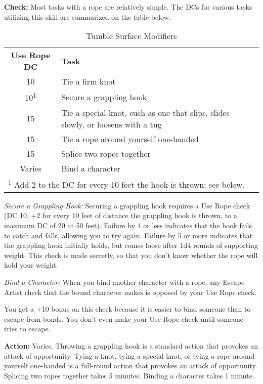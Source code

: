 
\textbf{Check:} Most tasks with a rope are relatively simple. The DCs for various 
tasks utilizing this skill are summarized on the table below.

\begin{table}[htb]
\caption{Tumble Surface Modifiers}
\centering
\begin{tabular}{c l}
\textbf{Use Rope DC} & \textbf{Task}\\
10 & Tie a firm knot\\
10\textsuperscript{1} & Secure a grappling hook\\
15 & Tie a special knot, such as one that slips, slides slowly, or loosens with a tug\\
15 & Tie a rope around yourself one-handed\\
15 & Splice two ropes together\\
Varies & Bind a character\\
\multicolumn{2}{l}{\textsuperscript{1} Add 2 to the DC for every 10 feet the hook is thrown; see below.}\\
\end{tabular}
\end{table}

\textit{Secure a Grappling Hook:} Securing a grappling hook requires a Use Rope 
check (DC 10, +2 for every 10 feet of distance the grappling hook is thrown, to 
a maximum DC of 20 at 50 feet). Failure by 4 or less indicates that the hook fails 
to catch and falls, allowing you to try again. Failure by 5 or more indicates that 
the grappling hook initially holds, but comes loose after 1d4 rounds of supporting 
weight. This check is made secretly, so that you don't know whether the rope will 
hold your weight.

\textit{Bind a Character:} When you bind another character with a rope, any Escape 
Artist check that the bound character makes is opposed by your Use Rope check.

You get a +10 bonus on this check because it is easier to bind someone than to 
escape from bonds. You don't even make your Use Rope check until someone tries 
to escape.

\textbf{Action:} Varies. Throwing a grappling hook is a standard action that provokes 
an attack of opportunity. Tying a knot, tying a special knot, or tying a rope around 
yourself one-handed is a full-round action that provokes an attack of opportunity. 
Splicing two ropes together takes 5 minutes. Binding a character takes 1 minute.

